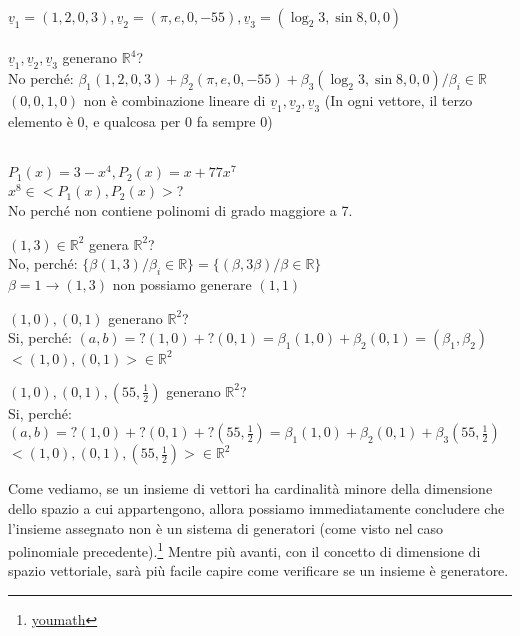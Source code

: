 \begin{es}
	\phantom{}\\
	$\underline{v}_1=(1,2,0,3),\underline{v}_2=(\pi,e,0,-55),\underline{v}_3=(\log_2 3,\sin 8,0,0)$\\\\
	$\underline{v}_1,\underline{v}_2,\underline{v}_3$ generano $\mathbb{R}^4$?\\
	No perché: $\beta_1(1,2,0,3)+\beta_2(\pi,e,0,-55)+\beta_3(\log_2 3,\sin 8,0,0)/\beta_i\in\mathbb{R}$\\
	$(0,0,1,0)$ non è combinazione lineare di $\underline{v}_1,\underline{v}_2,\underline{v}_3$ (In ogni vettore, il terzo elemento è 0, e qualcosa per 0 fa sempre 0)\\\\
\end{es}
\begin{es}
	$P_1(x)=3-x^4, P_2(x)=x+77x^7$\\
	$x^8\in<P_1(x),P_2(x)>$?\\
	No perché non contiene polinomi di grado maggiore a 7.
\end{es}
\begin{es}
	$(1,3)\in\mathbb{R}^2$ genera $\mathbb{R}^2$?\\
	No, perché: $\{\beta(1,3)/\beta_i\in\mathbb{R}\}=\{(\beta,3\beta)/\beta\in\mathbb{R}\}$\\
	$\beta=1\rightarrow(1,3)$ non possiamo generare $(1,1)$
\end{es}
\begin{es}
	$(1,0),(0,1)$ generano $\mathbb{R}^2$?\\
	Si, perché: $(a,b)=?(1,0)+?(0,1)=\beta_1(1,0)+\beta_2(0,1)=(\beta_1,\beta_2)$\\
	$<(1,0),(0,1)>\in\mathbb{R}^2$
\end{es}
\begin{es}
	$(1,0),(0,1),(55,\frac{1}{2})$ generano $\mathbb{R}^2$?\\
	Si, perché: $(a,b)=?(1,0)+?(0,1)+?(55,\frac{1}{2})=\beta_1(1,0)+\beta_2(0,1)+\beta_3(55,\frac{1}{2})$\\
	$<(1,0),(0,1),(55,\frac{1}{2})>\in\mathbb{R}^2$
\end{es}

Come vediamo, se un insieme di vettori ha cardinalità minore della dimensione dello spazio a cui appartengono, allora possiamo immediatamente concludere che l'insieme assegnato non è un sistema di generatori (come visto nel caso polinomiale precedente).\footnote{\href{https://www.youmath.it/lezioni/algebra-lineare/matrici-e-vettori/678-sistema-di-generatori-di-uno-spazio-vettoriale.html}{youmath}} Mentre più avanti, con il concetto di dimensione di spazio vettoriale, sarà più facile capire come verificare se un insieme è generatore.

